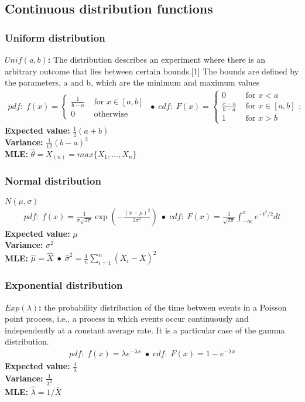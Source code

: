 \documentclass{article}
\begin{document}
\subsection{Continuous distribution functions}
\subsubsection{Uniform distribution}
\textbf{$Unif(a, b)$:} The distribution describes an experiment where there is an arbitrary outcome that lies between certain bounds.[1] The bounds are defined by the parameters, a and b, which are the minimum and maximum values
\begin{align*}
    pdf: \; f(x) = \begin{cases}
        \frac{1}{b-a} & \textrm{ for } x \in [a,b]\\
        0 & \textrm{ otherwise}
    \end{cases} \;\bullet\;
    cdf: \; F(x) = \begin{cases}
        0 & \textrm{ for } x < a\\
        \frac{x-a}{b-a} & \textrm{ for } x \in [a,b]\\
        1 & \textrm{ for } x > b
    \end{cases}; 
\end{align*}
\textbf{Expected value:} $\frac{1}{2}(a + b)$\\
\textbf{Variance:} $\frac{1}{12}(b - a)^2$\\
\textbf{MLE:} $\hat{\theta} = X_{(n)} = max\{X_1, \dots, X_n\}$

\subsubsection{Normal distribution}
\textbf{$N(\mu, \sigma)$}
\begin{align*}
    pdf: \; f(x) = \frac{1}{\sigma \sqrt{2 \pi}} \exp \left (-\frac{(x - \mu)^2}{2 \sigma ^ 2}\right ) \;\bullet\;
    cdf: \; F(x) = \frac{1}{\sqrt{2 \pi}} \int_{- \infty}^x e^{-t^2 / 2} dt
\end{align*}
\textbf{Expected value:} $\mu$\\
\textbf{Variance:} $\sigma^2$\\
\textbf{MLE:} $\hat{\mu} = \hat{X} \; \bullet \; \hat{\sigma}^2 = \frac{1}{n}\sum_{i=1}^n(X_i - \bar{X})^2$

\subsubsection{Exponential distribution}
\textbf{$Exp(\lambda)$:} the probability distribution of the time between events in a Poisson point process, i.e., a process in which events occur continuously and independently at a constant average rate. It is a particular case of the gamma distribution.
\begin{align*}
    pdf: \; f(x) = \lambda e^{-\lambda x} \;\bullet\; cdf: \; F(x) = 1 - e^{-\lambda x}
\end{align*}
\textbf{Expected value:} $\frac{1}{\lambda}$\\
\textbf{Variance:} $\frac{1}{\lambda^2}$\\
\textbf{MLE:} $\hat{\lambda} = 1 / \bar{X}$
\end{document}
